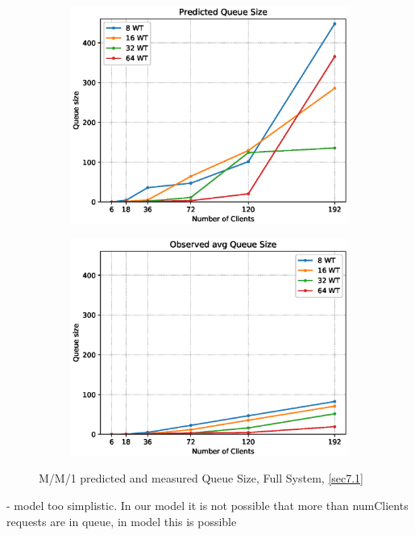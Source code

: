 \documentclass[11pt,a4paper]{article}
\begin{document}
\begin{figure}
    \begin{subfigure}{.5\textwidth}
        \includegraphics[width=1\linewidth]{plots/7_MM1_QueueSizePred.eps}
    \end{subfigure}
    \begin{subfigure}{.5\textwidth}
        \includegraphics[width=1\linewidth]{plots/7_MM1_QueueSizeObserved.eps}
    \end{subfigure}
    \caption{M/M/1 predicted and measured Queue Size, Full System, \autoref{sec7.1}}
    \label{fig:mm1-queueLen}
\end{figure}
- model too simplistic. In our model it is not possible that more than numClients requests are in queue, in model this is possible
\end{document}
